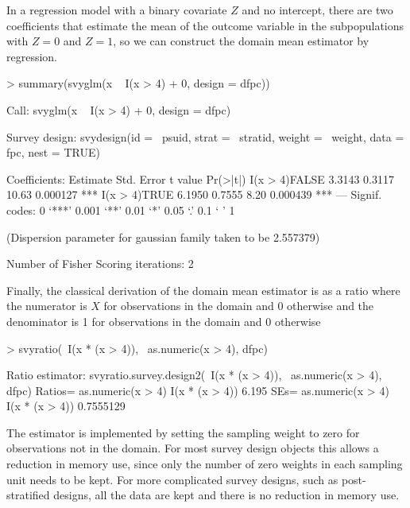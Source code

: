 \documentclass{article}
\begin{document}
In a regression model with a binary covariate $Z$ and no intercept,
there are two coefficients that estimate the mean of the outcome
variable in the subpopulations with $Z=0$ and $Z=1$, so we can
construct the domain mean estimator by regression.
\begin{Schunk}
\begin{Sinput}
> summary(svyglm(x ~ I(x > 4) + 0, design = dfpc))
\end{Sinput}
\begin{Soutput}
Call:
svyglm(x ~ I(x > 4) + 0, design = dfpc)

Survey design:
svydesign(id = ~psuid, strat = ~stratid, weight = ~weight, data = fpc, 
    nest = TRUE)

Coefficients:
              Estimate Std. Error t value Pr(>|t|)    
I(x > 4)FALSE   3.3143     0.3117   10.63 0.000127 ***
I(x > 4)TRUE    6.1950     0.7555    8.20 0.000439 ***
---
Signif. codes:  0 ‘***’ 0.001 ‘**’ 0.01 ‘*’ 0.05 ‘.’ 0.1 ‘ ’ 1 

(Dispersion parameter for gaussian family taken to be 2.557379)

Number of Fisher Scoring iterations: 2
\end{Soutput}
\end{Schunk}

Finally, the classical derivation of the domain mean estimator is as a
ratio where the numerator is $X$ for observations in the domain and 0
otherwise and the denominator is 1 for observations in the domain and
0 otherwise
\begin{Schunk}
\begin{Sinput}
> svyratio(~I(x * (x > 4)), ~as.numeric(x > 4), dfpc)
\end{Sinput}
\begin{Soutput}
Ratio estimator: svyratio.survey.design2(~I(x * (x > 4)), ~as.numeric(x > 4), 
    dfpc)
Ratios=
               as.numeric(x > 4)
I(x * (x > 4))             6.195
SEs=
               as.numeric(x > 4)
I(x * (x > 4))         0.7555129
\end{Soutput}
\end{Schunk}

The estimator is implemented by setting the sampling weight to zero
for observations not in the domain.  For most survey design objects
this allows a reduction in memory use, since only the number of zero
weights in each sampling unit needs to be kept. For more complicated
survey designs, such as post-stratified designs, all the data are kept
and there is no reduction in memory use.
\end{document}

